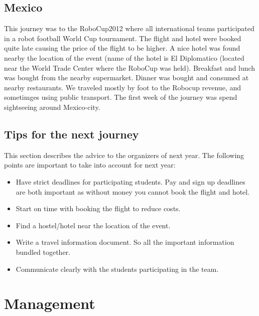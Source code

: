 \documentclass[11pt,a4paper,oneside]{article}
\begin{document}
\subsection{Mexico}
This journey was to the RoboCup2012 where all international teams participated in a robot football World Cup tournament. The flight and hotel were booked quite late causing the price of the flight to be higher. A nice hotel was found nearby the location of the event (name of the hotel is El Diplomatico (located near the World Trade Center where the RoboCup was held). Breakfast and lunch was bought from the nearby supermarket. Dinner was bought and consumed at nearby restaurants. We traveled mostly by foot to the Robocup revenue, and sometimges using public transport. The first week of the journey was spend sightseeing around Mexico-city.

\subsection{Tips for the next journey}
This section describes the advice to the organizers of next year. The following points are important to take into account for next year:
\begin{itemize}
\item Have strict deadlines for participating students. Pay and sign up deadlines are both important as without money you cannot book the flight and hotel.
\item Start on time with booking the flight to reduce costs.
\item Find a hostel/hotel near the location of the event.
\item Write a travel information document. So all the important information bundled together.
\item Communicate clearly with the students participating in the team.
\end{itemize}

\section{Management}
\end{document}
